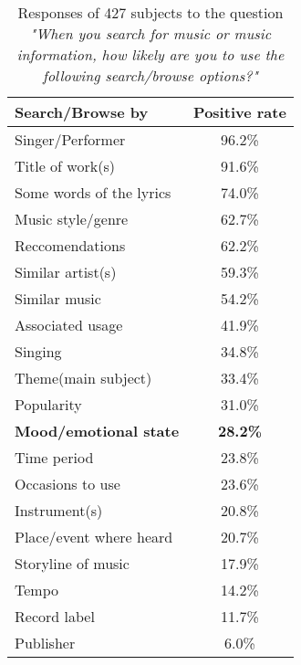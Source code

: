 \begin{table}[h!]
\centering
\begin{tabular}{|l | c|}
\hline
Search/Browse by & Positive rate\\ [0.5ex] 
\hline\hline Singer/Performer 			&		96.2\%	\\ 
\hline	Title of work(s) 					& 		91.6\%	\\ 
\hline	Some words of the lyrics 	& 		74.0\% 	\\
\hline	Music style/genre 				&		62.7\%	\\
\hline	Reccomendations 				&		62.2\%	\\
\hline	Similar artist(s)					&		59.3\%	\\
\hline	Similar music 					&		54.2\%	\\
\hline	Associated usage				&		41.9\% 	\\
\hline	Singing								&		34.8\% 	\\
\hline	Theme(main subject)			&		33.4\% 	\\
\hline	Popularity							&		31.0\% 	\\
\hline	\textbf{Mood/emotional state	}	&		\textbf{28.2\%} 	\\
\hline	Time period						&		23.8\% 	\\
\hline	Occasions to use				&		23.6\% 	\\
\hline	Instrument(s)					&		20.8\% 	\\
\hline	Place/event where heard	&		20.7\% 	\\
\hline	Storyline of music			&		17.9\% 	\\
\hline	Tempo								&		14.2\% 	\\
\hline	Record label						&		11.7\% 	\\
\hline	Publisher							&		6.0\% 	\\
\hline
\end{tabular}
\caption{Responses of 427 subjects to the question \textit{"When you search for music or music information, how likely are you to use the following search/browse options?"}}
\label{table:browse_music}
\end{table}

